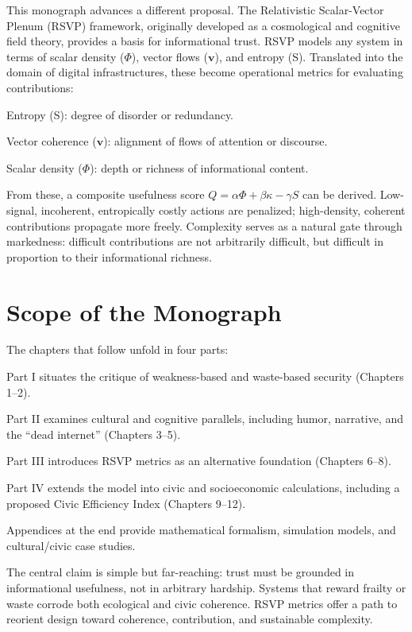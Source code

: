 \documentclass{book}
\begin{document}
This monograph advances a different proposal. The Relativistic Scalar-Vector Plenum (RSVP) framework, originally developed as a cosmological and cognitive field theory, provides a basis for informational trust. RSVP models any system in terms of scalar density (\(\Phi\)), vector flows (\(\mathbf{v}\)), and entropy (S). Translated into the domain of digital infrastructures, these become operational metrics for evaluating contributions:

Entropy (S): degree of disorder or redundancy.

Vector coherence (\(\mathbf{v}\)): alignment of flows of attention or discourse.

Scalar density (\(\Phi\)): depth or richness of informational content.

From these, a composite usefulness score \( Q = \alpha \Phi + \beta \kappa - \gamma S \) can be derived. Low-signal, incoherent, entropically costly actions are penalized; high-density, coherent contributions propagate more freely. Complexity serves as a natural gate through markedness: difficult contributions are not arbitrarily difficult, but difficult in proportion to their informational richness.

\section{Scope of the Monograph}

The chapters that follow unfold in four parts:

Part I situates the critique of weakness-based and waste-based security (Chapters 1–2).

Part II examines cultural and cognitive parallels, including humor, narrative, and the ``dead internet'' (Chapters 3–5).

Part III introduces RSVP metrics as an alternative foundation (Chapters 6–8).

Part IV extends the model into civic and socioeconomic calculations, including a proposed Civic Efficiency Index (Chapters 9–12).

Appendices at the end provide mathematical formalism, simulation models, and cultural/civic case studies.

The central claim is simple but far-reaching: trust must be grounded in informational usefulness, not in arbitrary hardship. Systems that reward frailty or waste corrode both ecological and civic coherence. RSVP metrics offer a path to reorient design toward coherence, contribution, and sustainable complexity.
\end{document}
